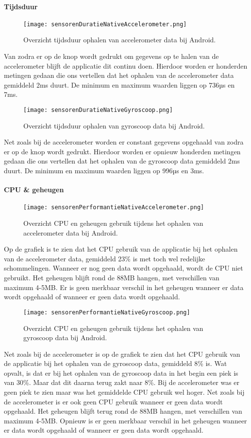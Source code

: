 \paragraph{Tijdsduur}
\begin{figure}[H]
    \centering
    \texttt{[image: sensorenDuratieNativeAccelerometer.png]}
    \caption{Overzicht tijdsduur ophalen van accelerometer data bij Android.}
\end{figure}
Van zodra er op de knop wordt gedrukt om gegevens op te halen van de accelerometer blijft de applicatie
dit continu doen. Hierdoor worden er honderden metingen gedaan die ons vertellen dat het ophalen 
van de accelerometer data gemiddeld 2ms duurt. De minimum en maximum waarden liggen op 736µs en 7ms.
\begin{figure}[H]
    \centering
    \texttt{[image: sensorenDuratieNativeGyroscoop.png]}
    \caption{Overzicht tijdsduur ophalen van gyroscoop data bij Android.}
\end{figure}
Net zoals bij de accelerometer worden er constant gegevens opgehaald van zodra er op de knop wordt gedrukt. 
Hierdoor worden er opnieuw honderden metingen gedaan die ons vertellen dat het ophalen 
van de gyroscoop data gemiddeld 2ms duurt. De minimum en maximum waarden liggen op 996µs en 3ms.

\paragraph{CPU \& geheugen}
\begin{figure}[H]
    \centering
    \texttt{[image: sensorenPerformantieNativeAccelerometer.png]}
    \caption{Overzicht CPU en geheugen gebruik tijdens het ophalen van accelerometer data bij Android.}
\end{figure}
Op de grafiek is te zien dat het CPU gebruik van de applicatie bij het ophalen van de accelerometer data,
gemiddeld 23\% is met toch wel redelijke schommelingen. Wanneer er nog geen data wordt opgehaald, wordt de CPU niet 
gebruikt. Het geheugen blijft rond de 88MB hangen, met verschillen van maximum 4-5MB. 
Er is geen merkbaar verschil in het geheugen wanneer er data wordt opgehaald of wanneer er 
geen data wordt opgehaald.
\begin{figure}[H]
    \centering
    \texttt{[image: sensorenPerformantieNativeGyroscoop.png]}
    \caption{Overzicht CPU en geheugen gebruik tijdens het ophalen van gyroscoop data bij Android.}
\end{figure}
Net zoals bij de accelerometer is op de grafiek te zien dat het CPU gebruik van de applicatie bij het 
ophalen van de gyroscoop data, gemiddeld 8\% is. Wat opvalt, is dat er bij het ophalen van de gyroscoop data
in het begin een piek is van 30\%. Maar dat dit daarna terug zakt naar 8\%. Bij de accelerometer was er geen
piek te zien maar was het gemiddelde CPU gebruik wel hoger. Net zoals bij de accelerometer is er ook geen 
CPU gebruik wanneer er geen data wordt opgehaald. Het geheugen blijft terug rond de 88MB hangen, met 
verschillen van maximum 4-5MB. Opnieuw is er geen merkbaar verschil in het 
geheugen wanneer er data wordt opgehaald of wanneer er geen data wordt opgehaald.
  
